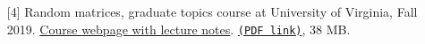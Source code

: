 \begin{enumerate}
\item[{[4]}]
Random matrices, graduate topics course at University of Virginia, Fall 2019. \href{https://lpetrov.cc/rmt19/}{Course webpage with lecture notes}. \href{https://storage.lpetrov.cc/papers/lec04-rmt-fall2019.pdf}{\texttt{(PDF link)}}, 38 MB.














































































































\end{enumerate}
